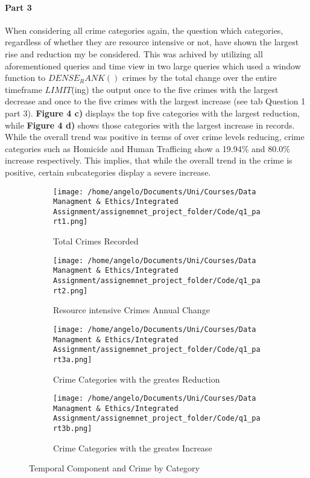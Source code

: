 \documentclass[a4paper]{article}
\begin{document}
\paragraph{Part 3} When considering all crime categories again, the question which categories, regardless of whether they are resource intensive or not, have shown the largest rise and reduction my be considered. This was achived by utilizing all aforementioned queries and time view in two large queries which used a window function to $DENSE_RANK()$ crimes by the total change over the entire timeframe $LIMIT$(ing) the output once to the five crimes with the largest decrease and once to the five crimes with the largest increase (see tab Question 1 part 3). \textbf{Figure 4 c)} displays the top five categories with the largest reduction, while \textbf{Figure 4 d)} shows those categories with the largest increase in records. While the overall trend was positive in terms of over crime levels reducing, crime categories such as Homicide and Human Trafficing show a 19.94\% and 80.0\% increase respectively. This implies, that while the overall trend in the crime is positive, certain subcategories display a severe increase.  


\begin{wrapfigure}{L}{9cm}
\centering
\begin{subfigure}[b]{0.5\textwidth}
\texttt{[image: /home/angelo/Documents/Uni/Courses/Data Managment \& Ethics/Integrated Assignment/assignemnet\_project\_folder/Code/q1\_part1.png]}
   \caption{Total Crimes Recorded}
   \label{fig:Ng2}
\end{subfigure}

\begin{subfigure}[b]{0.5\textwidth}
\texttt{[image: /home/angelo/Documents/Uni/Courses/Data Managment \& Ethics/Integrated Assignment/assignemnet\_project\_folder/Code/q1\_part2.png]}
   \caption{Resource intensive Crimes Annual Change}
   \label{fig:Ng2}
\end{subfigure}

\begin{subfigure}[b]{0.5\textwidth}
\texttt{[image: /home/angelo/Documents/Uni/Courses/Data Managment \& Ethics/Integrated Assignment/assignemnet\_project\_folder/Code/q1\_part3a.png]}
   \caption{Crime Categories with the greates Reduction}
   \label{fig:Ng2}
\end{subfigure}

\begin{subfigure}[b]{0.5\textwidth}
\texttt{[image: /home/angelo/Documents/Uni/Courses/Data Managment \& Ethics/Integrated Assignment/assignemnet\_project\_folder/Code/q1\_part3b.png]}
   \caption{Crime Categories with the greates Increase}
   \label{fig:Ng2}
\end{subfigure}

\captionsetup{justification=centering}
\caption{Temporal Component and Crime by Category}
\end{wrapfigure}
\end{document}
